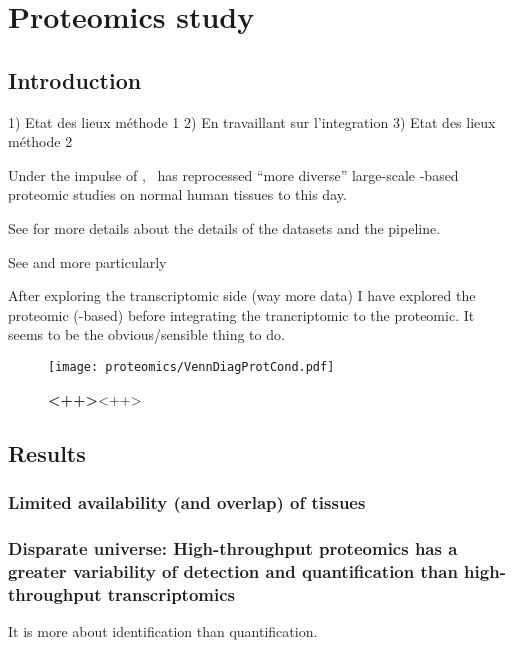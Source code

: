 \chapter{Proteomics study}
\label{ch:proteomics}

\section{Introduction}


1) Etat des lieux méthode 1
2) En travaillant sur l'integration 
3) Etat des lieux méthode 2



Under the impulse of \jyoti, \james\ has reprocessed \enquote{more diverse}
large-scale \ms-based proteomic studies on normal human tissues to this day.

See  for more details about the details of the datasets and
the pipeline.

See  and more particularly 

After exploring the transcriptomic side (way more data) I have explored the
proteomic (\ms-based) before integrating the trancriptomic to the proteomic.
It seems to be the obvious/sensible thing to do.

\begin{figure}[htpb]
    \texttt{[image: proteomics/VennDiagProtCond.pdf]}\centering
    \caption[ ]{\label{VennDiagProt3}\textbf{<++>}<++>}
\end{figure}

\section{Results}

\subsection{Limited availability (and overlap) of tissues}

\subsection{Disparate universe: High-throughput proteomics has a greater
variability of detection and quantification than high-throughput transcriptomics}

It is more about identification than quantification.

